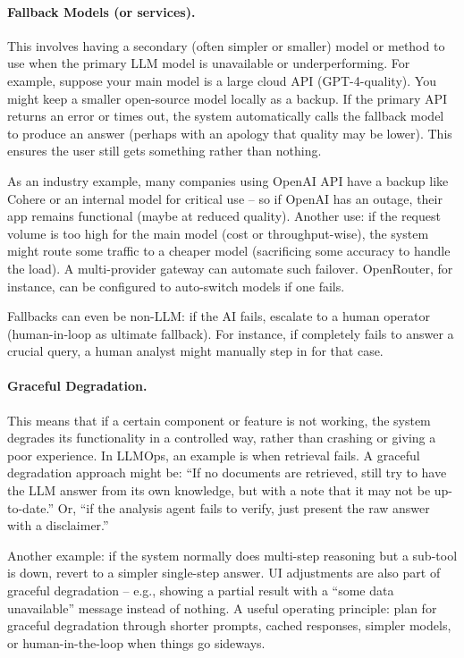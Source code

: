 \paragraph*{Fallback Models (or services).}
This involves having a secondary (often simpler or smaller) model or method to use when the primary LLM model is unavailable or underperforming. For example, suppose your main model is a large cloud API (GPT-4-quality). You might keep a smaller open-source model locally as a backup. If the primary API returns an error or times out, the system automatically calls the fallback model to produce an answer (perhaps with an apology that quality may be lower). This ensures the user still gets something rather than nothing.  

As an industry example, many companies using OpenAI API have a backup like Cohere or an internal model for critical use – so if OpenAI has an outage, their app remains functional (maybe at reduced quality). Another use: if the request volume is too high for the main model (cost or throughput-wise), the system might route some traffic to a cheaper model (sacrificing some accuracy to handle the load). A multi-provider gateway can automate such failover. OpenRouter, for instance, can be configured to auto-switch models if one fails.  

Fallbacks can even be non-LLM: if the AI fails, escalate to a human operator (human-in-loop as ultimate fallback). For instance, if \ishtar{} completely fails to answer a crucial query, a human analyst might manually step in for that case.

\paragraph*{Graceful Degradation.}
This means that if a certain component or feature is not working, the system degrades its functionality in a controlled way, rather than crashing or giving a poor experience. In LLMOps, an example is when retrieval fails. A graceful degradation approach might be: “If no documents are retrieved, still try to have the LLM answer from its own knowledge, but with a note that it may not be up-to-date.” Or, “if the analysis agent fails to verify, just present the raw answer with a disclaimer.”  

Another example: if the system normally does multi-step reasoning but a sub-tool is down, revert to a simpler single-step answer. UI adjustments are also part of graceful degradation – e.g., showing a partial result with a “some data unavailable” message instead of nothing. A useful operating principle: plan for graceful degradation through shorter prompts, cached responses, simpler models, or human-in-the-loop when things go sideways.


